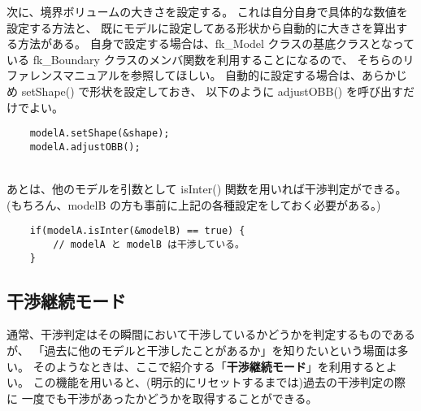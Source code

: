 次に、境界ボリュームの大きさを設定する。
これは自分自身で具体的な数値を設定する方法と、
既にモデルに設定してある形状から自動的に大きさを算出する方法がある。
自身で設定する場合は、fk\_Model クラスの基底クラスとなっている
fk\_Boundary クラスのメンバ関数を利用することになるので、
そちらのリファレンスマニュアルを参照してほしい。
自動的に設定する場合は、あらかじめ setShape() で形状を設定しておき、
以下のように adjustOBB() を呼び出すだけでよい。
\\
\begin{breakbox}
\begin{verbatim}
    modelA.setShape(&shape);
    modelA.adjustOBB();
\end{verbatim}
\end{breakbox}
~ \\
あとは、他のモデルを引数として isInter() 関数を用いれば干渉判定ができる。
(もちろん、modelB の方も事前に上記の各種設定をしておく必要がある。)
\\
\begin{breakbox}
\begin{verbatim}
    if(modelA.isInter(&modelB) == true) {
        // modelA と modelB は干渉している。
    }
\end{verbatim}
\end{breakbox}

\subsection{干渉継続モード}
通常、干渉判定はその瞬間において干渉しているかどうかを判定するものであるが、
「過去に他のモデルと干渉したことがあるか」を知りたいという場面は多い。
そのようなときは、ここで紹介する「\textbf{干渉継続モード}」を利用するとよい。
この機能を用いると、(明示的にリセットするまでは)過去の干渉判定の際に
一度でも干渉があったかどうかを取得することができる。

